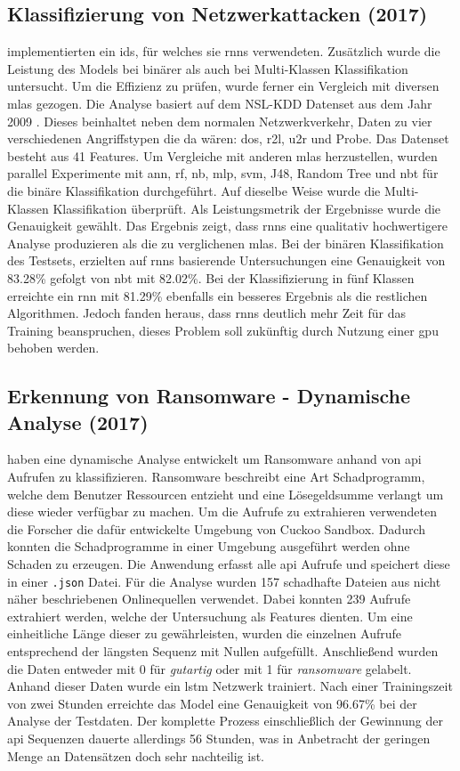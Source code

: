 \documentclass[
    12pt, %
    DIV10,
    ngerman, %
    a4paper, %
    oneside, %
    titlepage, %
    parskip=half, %
    headings=normal, %
    listof=totoc, %
    bibliography=totoc, %
    index=totoc, %
    captions=tableheading, %
    final %
]{scrreprt}
\begin{document}
\subsection{Klassifizierung von Netzwerkattacken (2017)}\label{yin}
\textcite{Yin2017} implementierten ein \ac{ids}, für welches sie \ac{rnns} verwendeten. Zusätzlich wurde die Leistung des Models bei binärer als auch bei Multi-Klassen Klassifikation untersucht. Um die Effizienz zu prüfen, wurde ferner ein Vergleich mit diversen \ac{mlas} gezogen. Die Analyse basiert auf dem NSL-KDD Datenset aus dem Jahr 2009 \parencite{Cybersecurity}. Dieses beinhaltet neben dem normalen Netzwerkverkehr, Daten zu vier verschiedenen Angriffstypen die da wären: \ac{dos}, \ac{r2l}, \ac{u2r} und Probe. Das Datenset besteht aus 41 Features. Um Vergleiche mit anderen \ac{mlas} herzustellen, wurden parallel Experimente mit \ac{ann}, \ac{rf}, \ac{nb}, \ac{mlp}, \ac{svm}, J48, Random Tree und \ac{nbt} für die binäre Klassifikation durchgeführt. Auf dieselbe Weise wurde die Multi-Klassen Klassifikation überprüft. Als Leistungsmetrik der Ergebnisse wurde die Genauigkeit gewählt. Das Ergebnis zeigt, dass \ac{rnns} eine qualitativ hochwertigere Analyse produzieren als die zu verglichenen \ac{mlas}. Bei der binären Klassifikation des Testsets, erzielten auf \ac{rnns} basierende Untersuchungen eine Genauigkeit von 83.28\% gefolgt von \ac{nbt} mit 82.02\%. Bei der Klassifizierung in fünf Klassen erreichte ein \ac{rnn} mit 81.29\% ebenfalls ein besseres Ergebnis als die restlichen Algorithmen. Jedoch fanden \textcite{Yin2017} heraus, dass \ac{rnns} deutlich mehr Zeit für das Training beanspruchen, dieses Problem soll zukünftig durch Nutzung einer \ac{gpu} behoben werden.
%
\subsection{Erkennung von Ransomware - Dynamische Analyse (2017)}
\textcite{Maniath2018} haben eine dynamische Analyse entwickelt um Ransomware anhand von \ac{api} Aufrufen zu klassifizieren. Ransomware beschreibt eine Art Schadprogramm, welche dem Benutzer Ressourcen entzieht und eine Lösegeldsumme verlangt um diese wieder verfügbar zu machen. Um die Aufrufe zu extrahieren verwendeten die Forscher die dafür entwickelte Umgebung von Cuckoo Sandbox. Dadurch konnten die Schadprogramme in einer Umgebung ausgeführt werden ohne Schaden zu erzeugen. Die Anwendung erfasst alle \ac{api} Aufrufe und speichert diese in einer \texttt{.json} Datei. Für die Analyse wurden 157 schadhafte Dateien aus nicht näher beschriebenen Onlinequellen verwendet. Dabei konnten 239 Aufrufe extrahiert werden, welche der Untersuchung als Features dienten. Um eine einheitliche Länge dieser zu gewährleisten, wurden die einzelnen Aufrufe entsprechend der längsten Sequenz mit Nullen aufgefüllt. Anschlie{\ss}end wurden die Daten entweder mit 0 für \emph{gutartig} oder mit 1 für \emph{ransomware} gelabelt. Anhand dieser Daten wurde ein \ac{lstm} Netzwerk trainiert. Nach einer Trainingszeit von zwei Stunden erreichte das Model eine Genauigkeit von 96.67\% bei der Analyse der Testdaten. Der komplette Prozess einschlie{\ss}lich der Gewinnung der \ac{api} Sequenzen dauerte allerdings 56 Stunden, was in Anbetracht der geringen Menge an Datensätzen doch sehr nachteilig ist.
%
\end{document}
